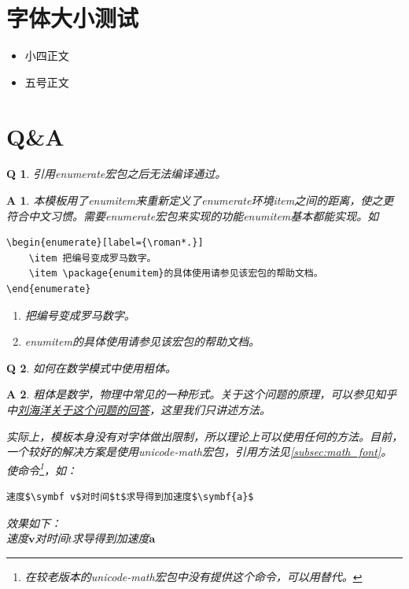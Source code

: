 \documentclass{LZU}
\newcommand{\package}[1]{{\sffamily #1}}
\newtheorem*{answer}{A}
\newtheorem{question}{Q}
\begin{document}
\section{字体大小测试}
\begin{itemize}
    \item {小四}正文
    \item {五号}正文
\end{itemize}

\backmatter
\nocite{*}
\printbibliography[title={参考文献},heading=bibintoc]
\Appendix
\section{Q\&A}
\begin{question}
    引用\package{enumerate}宏包之后无法编译通过。
\end{question}
\begin{answer}
    本模板用了\package{enumitem}来重新定义了enumerate环境item之间的距离，使之更符合中文习惯。需要\package{enumerate}宏包来实现的功能\package{enumitem}基本都能实现。如
\begin{verbatim}
\begin{enumerate}[label={\roman*.}]
    \item 把编号变成罗马数字。
    \item \package{enumitem}的具体使用请参见该宏包的帮助文档。
\end{enumerate}
\end{verbatim}
    \begin{enumerate}[label={\roman*.}]
        \item 把编号变成罗马数字。
        \item \package{enumitem}的具体使用请参见该宏包的帮助文档。
    \end{enumerate}
\end{answer}
\begin{question}
    如何在数学模式中使用粗体。
\end{question}
\begin{answer}
    粗体是数学，物理中常见的一种形式。关于这个问题的原理，可以参见知乎中\href{https://www.zhihu.com/question/25290041/answer/30422583}{刘海洋关于这个问题的回答}\supercite{mathboldfont}，这里我们只讲述方法。

    实际上，模板本身没有对字体做出限制，所以理论上可以使用任何的方法。目前，一个较好的解决方案是使用\package{unicode-math}宏包，引用方法见\cref{subsec:math_font}。使\texttt{\symbf}命令\footnote{在较老版本的\package{unicode-math}宏包中没有提供这个命令，可以用\texttt{\mathbf}替代。}，如：
\begin{verbatim}
速度$\symbf v$对时间$t$求导得到加速度$\symbf{a}$
\end{verbatim}
效果如下：\\
速度$\symbf v$对时间$t$求导得到加速度$\symbf{a}$
\end{answer}
\end{document}
